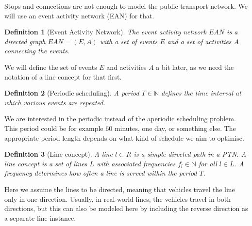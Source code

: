 \documentclass[english, 12pt, a4paper, sci, utf8, a-2b, online]{aaltothesis}
\newtheorem{definition}{Definition}
\newcommand{\N}{\mathbb{N}}
\newcommand{\period}{T}
\begin{document}
Stops and connections are not enough to model the public transport network. We will use an event activity network (EAN) for that.
\begin{definition}[Event Activity Network]\label{def:ean}
    The event activity network $EAN$ is a directed graph $\textit{EAN} = (E, A)$ with a set of events $E$ and a set of activities $A$ connecting the events.
\end{definition}
We will define the set of events $E$ and activities $A$ a bit later, as we need the notation of a line concept for that first.

\begin{definition}[Periodic scheduling] 
    A period $\period \in \N$ defines the time interval at which various events are repeated.
\end{definition}

We are interested in the periodic instead of the aperiodic scheduling problem. This period could be for example 60 minutes, one day, or something else. The appropriate period length depends on what kind of schedule we aim to optimise. %

\begin{definition}[Line concept]
    A \textit{line} $l \subset R$ is a simple directed path in a PTN. A \textit{line concept} is a set of lines $L$ with associated frequencies $f_l \in \N$ for all $l \in L$. A frequency determines how often a line is served within the period $T$.
\end{definition}


Here we assume the lines to be directed, meaning that vehicles travel the line only in one direction. Usually, in real-world lines, the vehicles travel in both directions, but this can also be modeled here by including the reverse direction as a separate line instance. %
\end{document}
